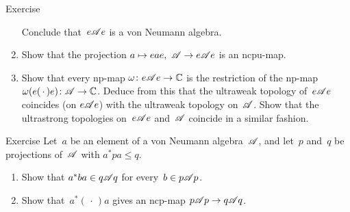\documentclass[a]{subfiles}
\begin{document}
\begin{parsec}
\begin{point}{Exercise}
\begin{enumerate}
Conclude that~$e\mathscr{A} e$ is a von Neumann algebra.
\item
Show that the projection $a\mapsto eae,\ \mathscr{A}\to e\mathscr{A} e$
is an ncpu-map.
\item
Show that every np-map $\omega\colon e\mathscr{A} e\to\mathbb{C}$
is the restriction
of the np-map $\omega(e(\,\cdot\,)e)\colon \mathscr{A}\to\mathbb{C}$.
Deduce from this that the ultraweak topology of~$e\mathscr{A} e$
coincides (on $e\mathscr{A} e$) with the ultraweak topology on~$\mathscr{A}$.
Show that the ultrastrong topologies on~$e\mathscr{A} e$ and~$\mathscr{A}$
coincide in a similar fashion.
\end{enumerate}
\end{point}
\begin{point}[ad-ncp]{Exercise}%
Let~$a$ be an element of a von Neumann algebra~$\mathscr{A}$,
and let~$p$ and~$q$ be projections
of~$\mathscr{A}$ with $a^*pa\leq q$.
\begin{enumerate}
\item
Show that $a^*ba\in q\mathscr{A} q$
for every~$b\in p\mathscr{A} p$.
\item
Show that~$a^*(\,\cdot\,)a$
gives an ncp-map $p\mathscr{A} p\to q\mathscr{A} q$.
\end{enumerate}
\end{point}
\end{parsec}%
\end{document}
